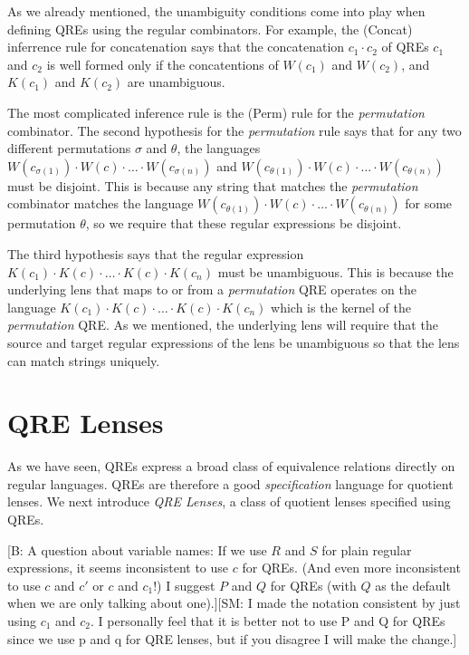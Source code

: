 \documentclass[acmsmall,review,anonymous]{acmart}
\newcommand{\FINISH}[3]{\ifdraft\textcolor{#1}{[#2: #3]}\fi}
\newcommand{\bcp}[1]{\FINISH{dkred}{B}{#1}}
\newcommand{\sam}[1]{\FINISH{dkpurple}{SM}{#1}}
\begin{document}
As we already mentioned, the unambiguity conditions come into play when defining
QREs using the regular combinators. For example, the (Concat) inferrence rule
for concatenation says that the concatenation $c_1 \cdot c_2$ of QREs $c_1$ and
$c_2$ is well formed only if the concatentions of $W(c_1)$ and $W(c_2)$, and
$K(c_1)$ and $K(c_2)$ are unambiguous.

The most complicated inference rule is the (Perm) rule for the
\textit{permutation} combinator. The second hypothesis for the
\textit{permutation} rule says that for any two different permutations $\sigma$
and $\theta$, the languages $W(c_{\sigma(1)}) \cdot W(c) \cdot \ldots \cdot
W(c_{\sigma(n)})$ and $W(c_{\theta(1)}) \cdot W(c) \cdot \ldots \cdot
W(c_{\theta(n)})$ must be disjoint. This is because any string that matches the
\textit{permutation} combinator matches the language $W(c_{\theta(1)}) \cdot
W(c) \cdot \ldots \cdot W(c_{\theta(n)})$ for some permutation $\theta$, so we
require that these regular expressions be disjoint.

The third hypothesis says that the regular expression $K(c_1) \cdot K(c)
\cdot \ldots \cdot K(c) \cdot K(c_n)$ must be unambiguous. This is because the
underlying lens that maps to or from a \textit{permutation} QRE operates on
the language $K(c_1) \cdot K(c) \cdot \ldots \cdot K(c) \cdot K(c_n)$ which is
the kernel of the \textit{permutation} QRE. As we mentioned, the underlying
lens will require that the source and target regular expressions of the lens be
unambiguous so that the lens can match strings uniquely.


\section{QRE Lenses}
\label{QRE-lenses}
As we have seen, QREs express a broad class of equivalence relations
directly on regular languages.  QREs are therefore a good \textit{specification}
language for quotient lenses. We next introduce
\textit{QRE Lenses}, a class of quotient lenses specified using QREs.

\bcp{A question about variable names: If we use $R$ and $S$ for plain
  regular expressions, it seems inconsistent to use $c$ for QREs.  (And even
  more inconsistent to use $c$ and $c'$ or $c$ and $c_1$!) I suggest $P$ and
  $Q$ for QREs (with $Q$ as the default when we are only talking about
  one).}\sam{I made the notation consistent by just using $c_1$ and $c_2$. I
  personally feel that it is better not to use P and Q for QREs since we use p
  and q for QRE lenses, but if you disagree I will make the change.}
\end{document}

